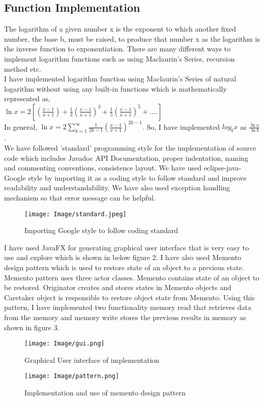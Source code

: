 \documentclass[12pt]{report}
\begin{document}
{\subsection{Function Implementation}
\noindent The logarithm of a given number x is the exponent to which another fixed number, the base b, must be raised, to produce that number x as the logarithm is the inverse function to exponentiation. There are many different ways to implement logarithm functions such as using Maclaurin's Series, recursion method etc. \\
I have implemented logarithm function using Maclaurin's Series of natural logarithm without using any built-in functions which is mathematically represented as,\\
$\ln x = 2[(\frac{x-1}{x+1}) + \frac{1}{3}(\frac{x-1}{x+1})^3 + \frac{1}{5}(\frac{x-1}{x+1})^5 + ....]$ \\
\newline
\noindent
In general, $\ln x = 2\sum_{k=1}^{\infty} \frac{1}{2k-1} (\frac{x-1}{x+1})^{2k-1}$. So, I have implemented \textbf{$log_b x$} as $\frac{\ln x}{\ln b}$.\\
\newline
\noindent
We have followed 'standard' programming style for the implementation of source code which includes Javadoc API Documentation, proper indentation, naming and commenting conventions, consistence layout. 
We have used eclipse-java-Google style by importing it as a coding style to follow standard and improve readability and understandability. We have also used exception handling mechanism so that error message can be helpful.
\begin{figure}[h!]
    \texttt{[image: Image/standard.jpeg]}
    \caption{Importing Google style to follow coding standard}
\end{figure}
\noindent
\newline
I have used JavaFX for generating graphical user interface that is very easy to use and explore which is shown in below figure 2.
\newline
I have also used Memento design pattern which is used to restore state of an object to a previous state. Memento pattern uses three actor classes. Memento contains state of an object to be restored. Originator creates and stores states in Memento objects and Caretaker object is responsible to restore object state from Memento. Using this pattern, I have implemented two functionality memory read that retrieves data from the memory and memory write stores the previous results in memory as shown in figure 3. 
\begin{figure}[h!]
  \begin{center}
  \texttt{[image: Image/gui.png]}
  \end{center}  
    \caption{Graphical User interface of implementation}
\end{figure}
\begin{figure}[h!]
  \begin{center}
  \texttt{[image: Image/pattern.png]}
  \end{center}  
    \caption{Implementation and use of memento design pattern}
\end{figure}

}
\end{document}
